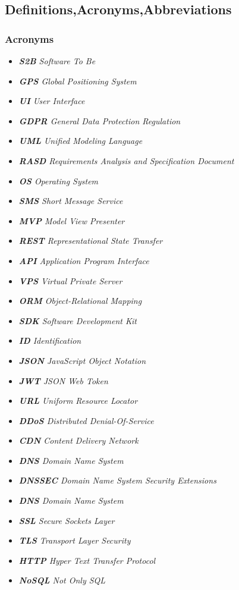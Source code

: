 \subsection{Definitions,Acronyms,Abbreviations}

\subsubsection{Acronyms}
\begin{itemize}
\item[] \emph{\textbf{S2B} Software To Be}
\item[] \emph{\textbf{GPS} Global Positioning System}
\item[] \emph{\textbf{UI} User Interface}
\item[] \emph{\textbf{GDPR} General Data Protection Regulation}
\item[] \emph{\textbf{UML} Unified Modeling Language}
\item[] \emph{\textbf{RASD} Requirements Analysis and Specification Document}
\item[] \emph{\textbf{OS} Operating System}
\item[] \emph{\textbf{SMS} Short Message Service}
\item[] \emph{\textbf{MVP} Model View Presenter}
\item[] \emph{\textbf{REST} Representational State Transfer}
\item[] \emph{\textbf{API} Application Program Interface}
\item[] \emph{\textbf{VPS} Virtual Private Server}
\item[] \emph{\textbf{ORM} Object-Relational Mapping}
\item[] \emph{\textbf{SDK} Software Development Kit}
\item[] \emph{\textbf{ID} Identification}
\item[] \emph{\textbf{JSON} JavaScript Object Notation}
\item[] \emph{\textbf{JWT} JSON Web Token}
\item[] \emph{\textbf{URL} Uniform Resource Locator}
\item[] \emph{\textbf{DDoS} Distributed Denial-Of-Service}
\item[] \emph{\textbf{CDN} Content Delivery Network}
\item[] \emph{\textbf{DNS} Domain Name System}
\item[] \emph{\textbf{DNSSEC} Domain Name System Security Extensions}
\item[] \emph{\textbf{DNS} Domain Name System}
\item[] \emph{\textbf{SSL} Secure Sockets Layer}
\item[] \emph{\textbf{TLS} Transport Layer Security}
\item[] \emph{\textbf{HTTP} Hyper Text Transfer Protocol}
\item[] \emph{\textbf{NoSQL} Not Only SQL}











\end{itemize}
